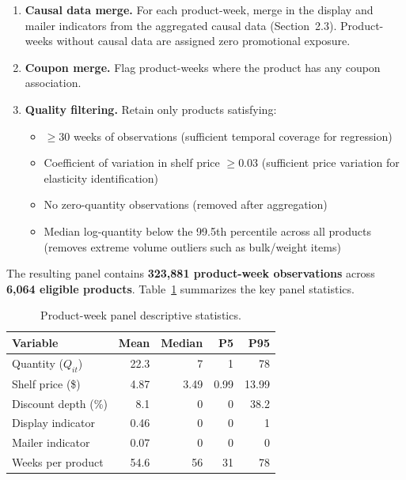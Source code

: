 \documentclass[12pt,a4paper]{article}
\begin{document}
\begin{enumerate}
\item \textbf{Causal data merge.} For each product-week, merge in
the display and mailer indicators from the aggregated causal data
(Section~2.3). Product-weeks without causal data are assigned zero
promotional exposure.

\item \textbf{Coupon merge.} Flag product-weeks where the product
has any coupon association.

\item \textbf{Quality filtering.} Retain only products satisfying:
\begin{itemize}[nosep]
\item $\geq 30$ weeks of observations (sufficient temporal coverage
for regression)
\item Coefficient of variation in shelf price $\geq 0.03$ (sufficient
price variation for elasticity identification)
\item No zero-quantity observations (removed after aggregation)
\item Median log-quantity below the 99.5th percentile across all
products (removes extreme volume outliers such as bulk/weight items)
\end{itemize}
\end{enumerate}

The resulting panel contains \textbf{323,881 product-week
observations} across \textbf{6,064 eligible products}.
Table~\ref{tab:panel-stats} summarizes the key panel statistics.

\begin{table}[H]
\centering
\caption{Product-week panel descriptive statistics.}
\label{tab:panel-stats}
\begin{tabular}{l rrrr}
\toprule
\textbf{Variable} & \textbf{Mean} & \textbf{Median} &
\textbf{P5} & \textbf{P95} \\
\midrule
Quantity ($Q_{it}$) & 22.3 & 7 & 1 & 78 \\
Shelf price (\$) & 4.87 & 3.49 & 0.99 & 13.99 \\
Discount depth (\%) & 8.1 & 0 & 0 & 38.2 \\
Display indicator & 0.46 & 0 & 0 & 1 \\
Mailer indicator & 0.07 & 0 & 0 & 0 \\
Weeks per product & 54.6 & 56 & 31 & 78 \\
\bottomrule
\end{tabular}
\end{table}

\end{document}
